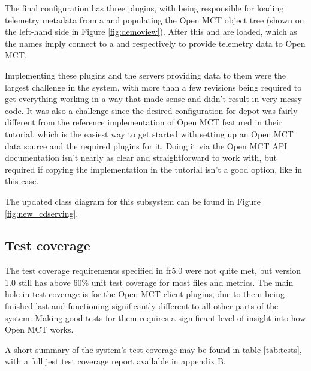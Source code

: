 The final configuration has three plugins, with  being responsible for loading telemetry \gls{metadata} from a  and populating the Open MCT object tree (shown on the left-hand side in Figure \ref{fig:demoview}). After this  and  are loaded, which as the names imply connect to a  and  respectively to provide telemetry data to Open MCT.

Implementing these plugins and the servers providing data to them were the largest challenge in the system, with more than a few revisions being required to get everything working in a way that made sense and didn't result in very messy code. It was also a challenge since the desired configuration for \Gls{depot} was fairly different from the reference implementation of Open MCT featured in their tutorial, which is the easiest way to get started with setting up an Open MCT data source and the required plugins for it. Doing it via the Open MCT API documentation isn't nearly as clear and straightforward to work with, but required if copying the implementation in the tutorial isn't a good option, like in this case.

The updated class diagram for this subsystem can be found in Figure \ref{fig:new_cdserving}.

\subsection{Test coverage}
The test coverage requirements specified in \acrshort{fr}5.0 were not quite met, but version 1.0 still has above $60\%$ unit test coverage for most files and metrics. The main hole in test coverage is for the Open MCT client plugins, due to them being finished last and functioning significantly different to all other parts of the system. Making good tests for them requires a significant level of insight into how Open MCT works.

A short summary of the system's test coverage may be found in table \ref{tab:tests}, with a full \Gls{jest} test coverage report available in appendix B.

